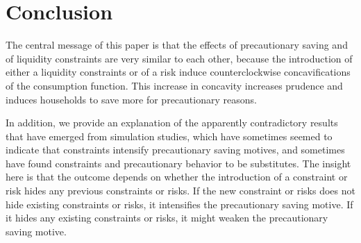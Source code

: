 \documentclass[titlepage]{\econtex}
\begin{document}
\section{Conclusion}

The central message of this paper is that the effects of precautionary saving and of liquidity constraints are very similar to each other, because the introduction of either a liquidity constraints or of a risk induce counterclockwise concavifications of the consumption function. This increase in concavity increases prudence and induces households to save more for precautionary reasons. 

In addition, we provide an explanation of the apparently contradictory results that have emerged from simulation studies, which have sometimes seemed to indicate that constraints intensify precautionary saving motives, and sometimes have found constraints and precautionary behavior to be substitutes. The insight here is that the outcome depends on whether the introduction of a constraint or risk hides any previous constraints or risks. If the new constraint or risks does not hide existing constraints or risks, it intensifies the precautionary saving motive. If it hides any existing constraints or risks, it might weaken the precautionary saving motive.  

\end{document}
